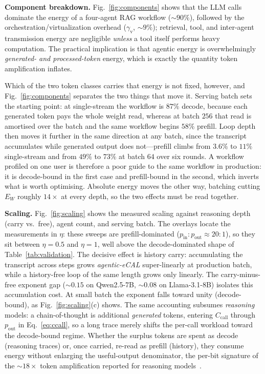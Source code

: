 \documentclass[journal]{IEEEtran}
\newif\ifshowchanges \showchangestrue
\newcommand{\NEW}{\ifshowchanges\color{blue}\fi}
\newcommand{\OLD}{\ifshowchanges\color{black}\fi}
\newcommand{\ROOF}{\ifshowchanges\color{green!45!black}\fi}
\newcommand{\reasoningBlow}{$\sim\!18\times$}  %
\newcommand{\agecal}{\textit{agentic-eCAL}}
\begin{document}
\textbf{Component breakdown.} Fig.~\ref{fig:components} shows that the LLM calls dominate the energy
of a four-agent RAG workflow (\NEW{}$\sim\!90\%$\OLD{}), followed by the orchestration/virtualization overhead
($\gamma_{\mathrm{v}}$, $\sim\!9\%$); retrieval, tool, and inter-agent transmission energy are
negligible \emph{unless} a tool itself performs heavy computation. The practical implication is that
agentic energy is overwhelmingly \emph{generated- and processed-token} energy, which is exactly the
quantity token amplification inflates.

\ROOF{}Which of the two token classes carries that energy is not fixed, however, and
Fig.~\ref{fig:components} separates the two things that move it. Serving batch sets the starting
point: at single-stream the workflow is $87\%$ decode, because each generated token pays the whole
weight read, whereas at batch $256$ that read is amortised over the batch and the same workflow
begins $58\%$ prefill. Loop depth then moves it further in the same direction at any batch, since
the transcript accumulates while generated output does not---prefill climbs from $3.6\%$ to $11\%$
single-stream and from $49\%$ to $73\%$ at batch $64$ over six rounds. A workflow profiled on one
user is therefore a poor guide to the same workflow in production: it is decode-bound in the first
case and prefill-bound in the second, which inverts what is worth optimising. Absolute energy moves
the other way, batching cutting $E_W$ roughly $14\times$ at every depth, so the two effects must be
read together.\OLD{}


\textbf{Scaling.} Fig.~\ref{fig:scaling} shows the measured scaling against reasoning depth (carry
vs.\ free), agent count, and serving batch. \NEW{}The overlays locate the measurements in $\eta$:
these sweeps are prefill-dominated ($p_{\mathrm{in}}\!:\!p_{\mathrm{out}}\approx20\!:\!1$), so they
sit between $\eta=0.5$ and $\eta=1$, well above the decode-dominated shape of
Table~\ref{tab:validation}.\OLD{} The decisive effect is history carry: accumulating the transcript across steps grows \agecal{}
super-linearly at production batch, while a history-free loop of the same length grows only linearly.
The carry-minus-free exponent gap ($\sim\!0.15$ on Qwen2.5-7B, $\sim\!0.08$ on Llama-3.1-8B) isolates
this accumulation cost. \NEW{}At small batch the exponent falls toward unity (decode-bound), as
Fig.~\ref{fig:scaling}(c) shows.\OLD{} The same accounting subsumes \emph{reasoning} models: a chain-of-thought is additional
\emph{generated} tokens, \NEW{}entering $C_{\mathrm{call}}$ through $p_{\mathrm{out}}$ in
Eq.~\eqref{eq:ccall}\OLD{}, so a
long trace merely shifts the per-call workload toward the decode-bound regime. Whether the surplus tokens are spent as decode (reasoning traces) or, once carried,
re-read as prefill (history), they consume energy without enlarging the useful-output
denominator, the per-bit signature of the \reasoningBlow{} token amplification reported for reasoning
models~\cite{llmthinkbench2025}.
\end{document}
